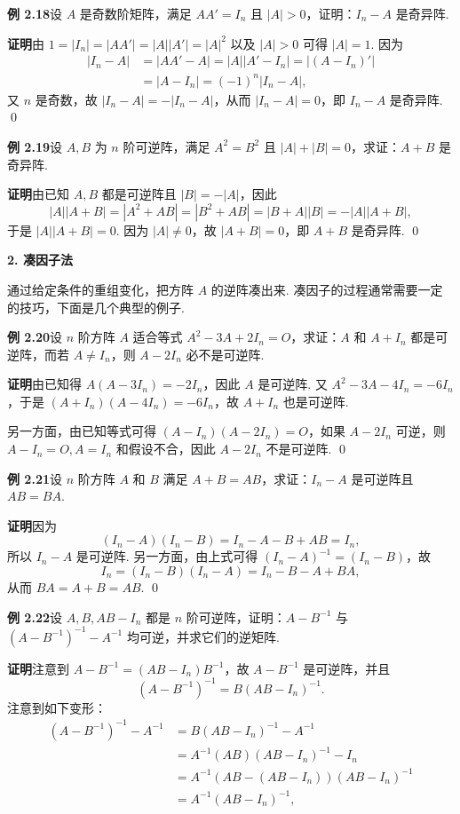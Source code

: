 \documentclass[UTF8,12pt,a4paper,fontset=fandol]{ctexart}
\begin{document}
\noindent\textbf{例 2.18}\quad 设 $A$ 是奇数阶矩阵，满足 $AA'=I_n$ 且 $|A|>0$，证明：$I_n-A$ 是奇异阵.

\noindent\textbf{证明}\quad 由 $1=|I_n|=|AA'|=|A||A'|=|A|^2$ 以及 $|A|>0$ 可得 $|A|=1$. 因为
\[
\begin{aligned}
|I_n-A|
&=|AA'-A|=|A||A'-I_n|=|(A-I_n)'|\\
&=|A-I_n|=(-1)^n|I_n-A|,
\end{aligned}
\]
又 $n$ 是奇数，故 $|I_n-A|=-|I_n-A|$，从而 $|I_n-A|=0$，即 $I_n-A$ 是奇异阵. \qed

\noindent\textbf{例 2.19}\quad 设 $A,B$ 为 $n$ 阶可逆阵，满足 $A^2=B^2$ 且 $|A|+|B|=0$，求证：$A+B$ 是奇异阵.

\noindent\textbf{证明}\quad 由已知 $A,B$ 都是可逆阵且 $|B|=-|A|$，因此
\[
|A||A+B|=|A^2+AB|=|B^2+AB|=|B+A||B|=-|A||A+B|,
\]
于是 $|A||A+B|=0$. 因为 $|A|\ne0$，故 $|A+B|=0$，即 $A+B$ 是奇异阵. \qed

\noindent\textbf{2. 凑因子法}

通过给定条件的重组变化，把方阵 $A$ 的逆阵凑出来. 凑因子的过程通常需要一定的技巧，下面是几个典型的例子.

\noindent\textbf{例 2.20}\quad 设 $n$ 阶方阵 $A$ 适合等式 $A^2-3A+2I_n=O$，求证：$A$ 和 $A+I_n$ 都是可逆阵，而若 $A\ne I_n$，则 $A-2I_n$ 必不是可逆阵.

\noindent\textbf{证明}\quad 由已知得 $A(A-3I_n)=-2I_n$，因此 $A$ 是可逆阵. 又 $A^2-3A-4I_n=-6I_n$，于是 $(A+I_n)(A-4I_n)=-6I_n$，故 $A+I_n$ 也是可逆阵.

另一方面，由已知等式可得 $(A-I_n)(A-2I_n)=O$，如果 $A-2I_n$ 可逆，则 $A-I_n=O,A=I_n$ 和假设不合，因此 $A-2I_n$ 不是可逆阵. \qed

\noindent\textbf{例 2.21}\quad 设 $n$ 阶方阵 $A$ 和 $B$ 满足 $A+B=AB$，求证：$I_n-A$ 是可逆阵且 $AB=BA$.

\noindent\textbf{证明}\quad 因为
\[
(I_n-A)(I_n-B)=I_n-A-B+AB=I_n,
\]
所以 $I_n-A$ 是可逆阵. 另一方面，由上式可得 $(I_n-A)^{-1}=(I_n-B)$，故
\[
I_n=(I_n-B)(I_n-A)=I_n-B-A+BA,
\]
从而 $BA=A+B=AB$. \qed

\noindent\textbf{例 2.22}\quad 设 $A,B,AB-I_n$ 都是 $n$ 阶可逆阵，证明：$A-B^{-1}$ 与 $(A-B^{-1})^{-1}-A^{-1}$ 均可逆，并求它们的逆矩阵.

\noindent\textbf{证明}\quad 注意到 $A-B^{-1}=(AB-I_n)B^{-1}$，故 $A-B^{-1}$ 是可逆阵，并且
\[
(A-B^{-1})^{-1}=B(AB-I_n)^{-1}.
\]
注意到如下变形：
\[
\begin{aligned}
(A-B^{-1})^{-1}-A^{-1}
&=B(AB-I_n)^{-1}-A^{-1}\\
&=A^{-1}(AB)(AB-I_n)^{-1}-I_n\\
&=A^{-1}(AB-(AB-I_n))(AB-I_n)^{-1}\\
&=A^{-1}(AB-I_n)^{-1},
\end{aligned}
\]
\end{document}
